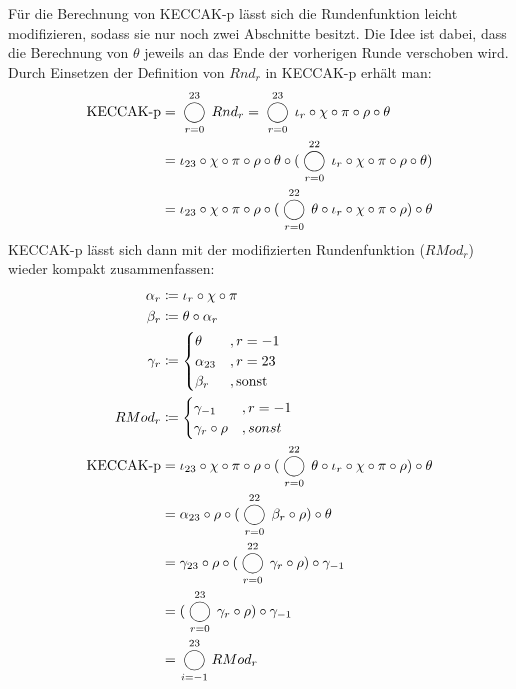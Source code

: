 Für die Berechnung von KECCAK-p lässt sich die Rundenfunktion leicht modifizieren, sodass sie nur noch zwei Abschnitte besitzt.
Die Idee ist dabei, dass die Berechnung von $\theta$ jeweils an das Ende der vorherigen Runde verschoben wird.
Durch Einsetzen der Definition von $Rnd_r$ in KECCAK-p erhält man:
\begin{align*}
    \text{KECCAK-p} & = \bigcomp_{r = 0}^{23} Rnd_r = \bigcomp_{r = 0}^{23} \iota_r \circ \chi \circ \pi \circ \rho \circ \theta \\
    & = \iota_{23} \circ \chi \circ \pi \circ \rho \circ \theta \circ (\bigcomp_{r = 0}^{22} \iota_r \circ \chi \circ \pi \circ \rho \circ \theta) \\
    & = \iota_{23} \circ \chi \circ \pi \circ \rho \circ (\bigcomp_{r = 0}^{22} \theta \circ \iota_r \circ \chi \circ \pi \circ \rho) \circ \theta
\end{align*}
KECCAK-p lässt sich dann mit der modifizierten Rundenfunktion ($RMod_r$) wieder kompakt zusammenfassen:
\begin{align*}
    \alpha_r & \coloneq \iota_r \circ \chi \circ \pi \\
    \beta_r & \coloneq \theta \circ \alpha_r \\
    \gamma_r & \coloneq
    \begin{cases}
        \theta & , r = -1 \\
        \alpha_{23} & , r = 23 \\
        \beta_r & , \text{sonst}
    \end{cases} \\
    RMod_r & \coloneq 
    \begin{cases}
        \gamma_{-1} & , r = -1 \\
        \gamma_r \circ \rho & , sonst
    \end{cases} \\
    \text{KECCAK-p} & = \iota_{23} \circ \chi \circ \pi \circ \rho \circ (\bigcomp_{r = 0}^{22} \theta \circ \iota_r \circ \chi \circ \pi \circ \rho) \circ \theta \\
    & = \alpha_{23} \circ \rho \circ (\bigcomp_{r = 0}^{22} \beta_r \circ \rho) \circ \theta \\
    & = \gamma_{23} \circ \rho \circ (\bigcomp_{r = 0}^{22} \gamma_r \circ \rho) \circ \gamma_{-1} \\
    & = (\bigcomp_{r = 0}^{23} \gamma_r \circ \rho) \circ \gamma_{-1} \\
    & = \bigcomp_{i = -1}^{23} RMod_r
\end{align*}
